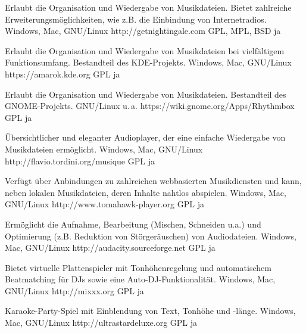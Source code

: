 





{Erlaubt die Organisation und Wiedergabe von Musikdateien. Bietet zahlreiche Erweiterungsmöglichkeiten, wie z.B. die Einbindung von Internetradios.}
{Windows, Mac, GNU/Linux}
{http://getnightingale.com}
{GPL, MPL, BSD}
{ja}

{Erlaubt die Organisation und Wiedergabe von Musikdateien bei vielfältigem Funktionsumfang. Bestandteil des KDE-Projekts.}
{Windows, Mac, GNU/Linux}
{https://amarok.kde.org}
{GPL}
{ja}

{Erlaubt die Organisation und Wiedergabe von Musikdateien. Bestandteil des GNOME-Projekts.}
{GNU/Linux u.\,a.}
{https://wiki.gnome.org/Apps/Rhythmbox}
{GPL}
{ja}

{Übersichtlicher und eleganter Audioplayer, der eine einfache Wiedergabe von Musikdateien ermöglicht.}
{Windows, Mac, GNU/Linux}
{http://flavio.tordini.org/musique}
{GPL}
{ja}

{Verfügt über Anbindungen zu zahlreichen webbasierten Musikdiensten und kann, neben lokalen Musikdateien, deren Inhalte nahtlos abspielen.}
{Windows, Mac, GNU/Linux}
{http://www.tomahawk-player.org}  %
{GPL}
{ja}

{Ermöglicht die Aufnahme, Bearbeitung (Mischen, Schneiden u.a.) und Optimierung (z.B. Reduktion von Störgeräuschen) von Audiodateien.}
{Windows, Mac, GNU/Linux}
{http://audacity.sourceforge.net}
{GPL}
{ja}

{Bietet virtuelle Plattenspieler mit Tonhöhenregelung und automatischem Beatmatching für DJs sowie eine Auto-DJ-Funktionalität.}
{Windows, Mac, GNU/Linux}
{http://mixxx.org}
{GPL}
{ja}

{Karaoke-Party-Spiel mit Einblendung von Text, Tonhöhe und -länge.}
{Windows, Mac, GNU/Linux}
{http://ultrastardeluxe.org}
{GPL}
{ja}


\backpage


